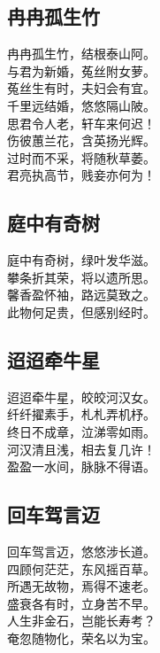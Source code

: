 \documentclass[]{article}
\begin{document}
\hypertarget{header-n34}{%
\subsection{冉冉孤生竹}\label{header-n34}}

冉冉孤生竹，结根泰山阿。\\
与君为新婚，菟丝附女萝。\\
菟丝生有时，夫妇会有宜。\\
千里远结婚，悠悠隔山陂。\\
思君令人老，轩车来何迟！\\
伤彼蕙兰花，含英扬光辉。\\
过时而不采，将随秋草萎。\\
君亮执高节，贱妾亦何为！

\hypertarget{header-n38}{%
\subsection{庭中有奇树}\label{header-n38}}

庭中有奇树，绿叶发华滋。\\
攀条折其荣，将以遗所思。\\
馨香盈怀袖，路远莫致之。\\
此物何足贵，但感别经时。

\hypertarget{header-n42}{%
\subsection{迢迢牵牛星}\label{header-n42}}

迢迢牵牛星，皎皎河汉女。\\
纤纤擢素手，札札弄机杼。\\
终日不成章，泣涕零如雨。\\
河汉清且浅，相去复几许！\\
盈盈一水间，脉脉不得语。

\hypertarget{header-n46}{%
\subsection{回车驾言迈}\label{header-n46}}

回车驾言迈，悠悠涉长道。\\
四顾何茫茫，东风摇百草。\\
所遇无故物，焉得不速老。\\
盛衰各有时，立身苦不早。\\
人生非金石，岂能长寿考？\\
奄忽随物化，荣名以为宝。
\end{document}
